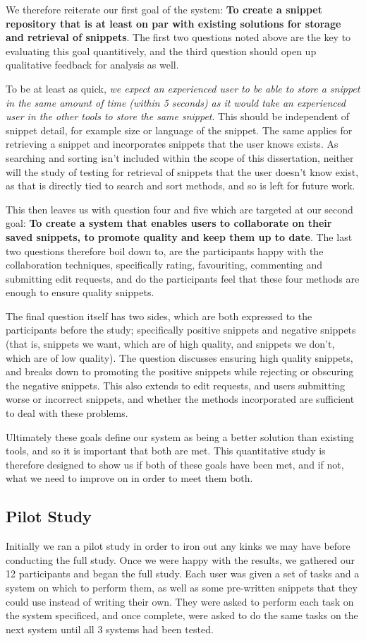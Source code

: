 We therefore reiterate our first goal of the system: \textbf{To create a snippet repository that is at least on par with existing solutions for storage and retrieval of snippets}.
The first two questions noted above are the key to evaluating this goal quantitively, and the third question should open up qualitative feedback for analysis as well.

To be at least as quick, \textit{we expect an experienced user to be able to store a snippet in the same amount of time (within 5 seconds) as it would take an experienced user in the other tools to store the same snippet}.
This should be independent of snippet detail, for example size or language of the snippet.
The same applies for retrieving a snippet and incorporates snippets that the user knows exists. 
As searching and sorting isn't included within the scope of this dissertation, neither will the study of testing for retrieval of snippets that the user doesn't know exist, as that is directly tied to search and sort methods, and so is left for future work.

This then leaves us with question four and five which are targeted at our second goal: \textbf{To create a system that enables users to collaborate on their saved snippets, to promote quality and keep them up to date}.
The last two questions therefore boil down to, are the participants happy with the collaboration techniques, specifically rating, favouriting, commenting and submitting edit requests, and do the participants feel that these four methods are enough to ensure quality snippets.

The final question itself has two sides, which are both expressed to the participants before the study; specifically positive snippets and negative snippets (that is, snippets we want, which are of high quality, and snippets we don't, which are of low quality). 
The question discusses ensuring high quality snippets, and breaks down to promoting the positive snippets while rejecting or obscuring the negative snippets.
This also extends to edit requests, and users submitting worse or incorrect snippets, and whether the methods incorporated are sufficient to deal with these problems.

Ultimately these goals define our system as being a better solution than existing tools, and so it is important that both are met.
This quantitative study is therefore designed to show us if both of these goals have been met, and if not, what we need to improve on in order to meet them both.

\subsection{Pilot Study}
Initially we ran a pilot study in order to iron out any kinks we may have before conducting the full study.
Once we were happy with the results, we gathered our 12 participants and began the full study.
Each user was given a set of tasks and a system on which to perform them, as well as some pre-written snippets that they could use instead of writing their own.
They were asked to perform each task on the system specificed, and once complete, were asked to do the same tasks on the next system until all 3 systems had been tested.

